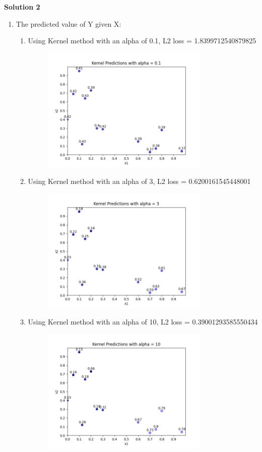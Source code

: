 \documentclass[submit]{harvardml}
\begin{document}
\newpage 
\textbf{Solution 2}
\begin{enumerate}
    \item The predicted value of Y given X:\\
    \begin{enumerate}
        \item Using Kernel method with an alpha of 0.1, L2 loss = 1.8399712540879825 \\
        \begin{figure}[H]
            \includegraphics[width=8cm]{hw1/T1P2_plots/plot1.png}
            \centering
        \end{figure}
        
        \item Using Kernel method with an alpha of 3, L2 loss = 0.6200161545448001\\
        \begin{figure}[H]
            \includegraphics[width=8cm]{hw1/T1P2_plots/plot2.png}
            \centering
        \end{figure}
        
        \item Using Kernel method with an alpha of 10, L2 loss = 0.39001293585550434 \\
        \begin{figure}[H]
            \includegraphics[width=8cm]{hw1/T1P2_plots/plot3.png}
            \centering
        \end{figure}
        

\end{enumerate}
\end{enumerate}
\end{document}
